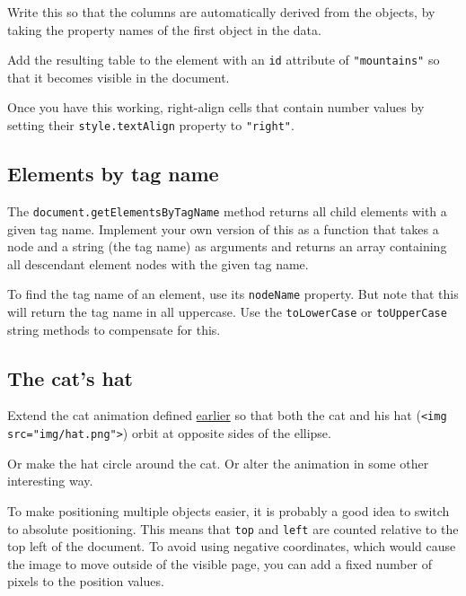 Write this so that the columns are automatically derived from the objects, by taking the property names of the first object in the data.

Add the resulting table to the element with an \lstinline`id` attribute of \lstinline`"mountains"` so that it becomes visible in the document.

Once you have this working, right-align cells that contain number values by setting their \lstinline`style.textAlign` property to \lstinline`"right"`.

\subsection{Elements by tag name}

The \lstinline`document.getElementsByTagName` method returns all child elements with a given tag name. Implement your own version of this as a function that takes a node and a string (the tag name) as arguments and returns an array containing all descendant element nodes with the given tag name.

To find the tag name of an element, use its \lstinline`nodeName` property. But note that this will return the tag name in all uppercase. Use the \lstinline`toLowerCase` or \lstinline`toUpperCase` string methods to compensate for this.

\subsection{The cat's hat}

Extend the cat animation defined \hyperref[dom.animation]{earlier} so that both the cat and his hat (\lstinline`<img src="img/hat.png">`) orbit at opposite sides of the ellipse.

Or make the hat circle around the cat. Or alter the animation in some other interesting way.

To make positioning multiple objects easier, it is probably a good idea to switch to absolute positioning. This means that \lstinline`top` and \lstinline`left` are counted relative to the top left of the document. To avoid using negative coordinates, which would cause the image to move outside of the visible page, you can add a fixed number of pixels to the position values.
